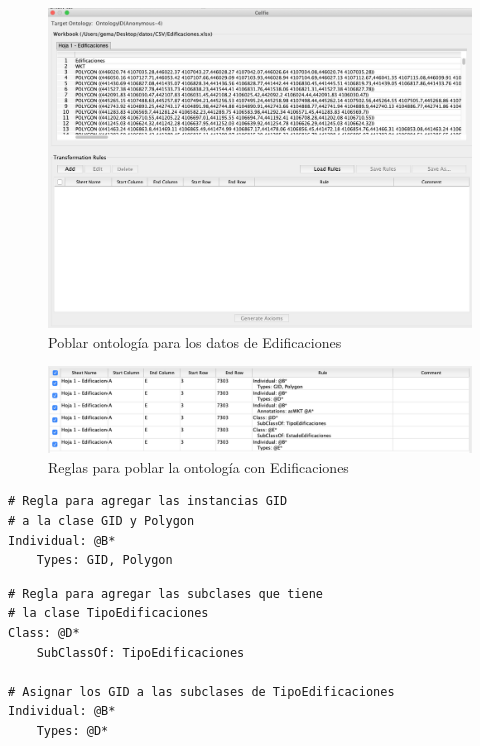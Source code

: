 \begin{figure}[H]
	\centering
	\includegraphics[width=0.8\linewidth]{imagenes/capitulo5/edificaciones1}
	\caption{Poblar ontología para los datos de Edificaciones}
	\label{fig:edificaciones1}
\end{figure}

\begin{figure}[H]
	\centering
	\includegraphics[width=0.9\linewidth]{imagenes/capitulo5/reglas-edificaciones}
	\caption{Reglas para poblar la ontología con Edificaciones}
	\label{fig:reglas-edificaciones}
\end{figure}

\begin{lstlisting}
# Regla para agregar las instancias GID 
# a la clase GID y Polygon
Individual: @B*
	Types: GID, Polygon
\end{lstlisting}

\begin{lstlisting}
# Regla para agregar las subclases que tiene 
# la clase TipoEdificaciones 
Class: @D*
	SubClassOf: TipoEdificaciones

# Asignar los GID a las subclases de TipoEdificaciones
Individual: @B*
	Types: @D*
\end{lstlisting}



